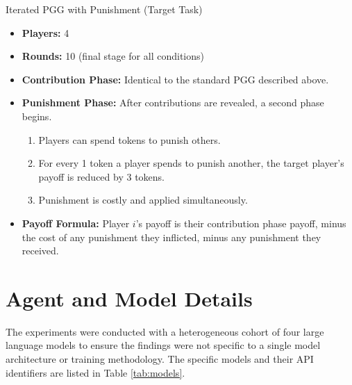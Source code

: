 \documentclass[11pt]{article}
\begin{document}
\begin{gamebox}{Iterated PGG with Punishment (Target Task)}
\begin{itemize}
    \item \textbf{Players:} 4
    \item \textbf{Rounds:} 10 (final stage for all conditions)
    \item \textbf{Contribution Phase:} Identical to the standard PGG described above.
    \item \textbf{Punishment Phase:} After contributions are revealed, a second phase begins.
        \begin{enumerate}
            \item Players can spend tokens to punish others.
            \item For every 1 token a player spends to punish another, the target player's payoff is reduced by 3 tokens.
            \item Punishment is costly and applied simultaneously.
        \end{enumerate}
    \item \textbf{Payoff Formula:} Player $i$'s payoff is their contribution phase payoff, minus the cost of any punishment they inflicted, minus any punishment they received.
\end{itemize}
\end{gamebox}

\section{Agent and Model Details}
\label{app:models}

The experiments were conducted with a heterogeneous cohort of four large language models to ensure the findings were not specific to a single model architecture or training methodology. The specific models and their API identifiers are listed in Table \ref{tab:models}.

\begin{table}[h]
  \caption{LLM Agents Used in Experiments.}
  \label{tab:models}
  \centering
\end{table}
\end{document}
